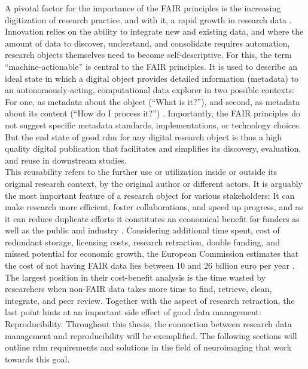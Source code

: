 A pivotal factor for the importance of the FAIR principles is the increasing digitization of research practice, and with it, a rapid growth in research data \citep{dfg}.
Innovation relies on the ability to integrate new and existing data, and where the amount of data to discover, understand, and consolidate requires automation, research objects themselves need to become self-descriptive.
For this, the term ``machine-actionable'' is central to the \gls{FAIR} principles.
It is used to describe an ideal state in which a digital object provides detailed information (metadata) to an autonomously-acting, computational data explorer in two possible contexts: For one, as metadata about the object (``What is it?''), and second, as metadata about its content (``How do I process it?'') \citep{wilkinson2016fair}.
Importantly, the \gls{FAIR} principles do not suggest specific metadata standards, implementations, or technology choices.
But the end state of good \gls{rdm} for any digital research object is thus a high quality digital publication that facilitates and simplifies its discovery, evaluation, and reuse in downstream studies.\\
This reusability refers to the further use or utilization inside or outside its original research context, by the original author or different actors.
It is arguably the most important feature of a research object for various stakeholders: It can make research more efficient, foster collaborations, and speed up progress, and as it can reduce duplicate efforts it constitutes an economical benefit for funders as well as the public and industry \citep{nfdi2022data}.
Considering additional time spent, cost of redundant storage, licensing costs, research retraction, double funding, and missed potential for economic growth, the European Commission estimates that the cost of not having FAIR data lies between 10 and 26 billion euro per year \citep{eu2019FAIR}.
The largest position in their cost-benefit analysis is the time wasted by researchers when non-FAIR data takes more time to find, retrieve, clean, integrate, and peer review.
Together with the aspect of research retraction, the last point hints at an important side effect of good data management: Reproducibility.
Throughout this thesis, the connection between research data management and reproducibility will be exemplified.
The following sections will outline \gls{rdm} requirements and solutions in the field of neuroimaging that work towards this goal.







